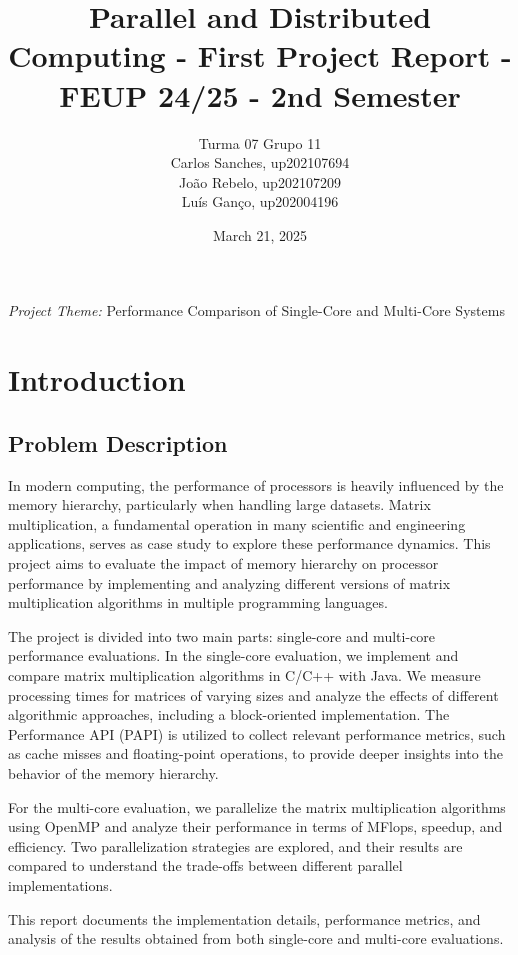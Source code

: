 \documentclass{article}
\title{Parallel and Distributed Computing - First Project Report - FEUP 24/25 - 2nd Semester}
\author{
Turma 07 Grupo 11 \\
Carlos Sanches, up202107694 \\
João Rebelo, up202107209 \\
Luís Ganço, up202004196
}
\date{March 21, 2025}
\begin{document}
\newpage 

\maketitle
\begin{center}
    \large \textit{Project Theme:} Performance Comparison of Single-Core and Multi-Core Systems
\end{center}
\newpage
\tableofcontents
\newpage %

\section{Introduction}

\subsection{Problem Description}
In modern computing, the performance of processors is heavily influenced by the memory hierarchy, particularly when handling large datasets. Matrix multiplication, a fundamental operation in many scientific and engineering applications, serves as case study to explore these performance dynamics. This project aims to evaluate the impact of memory hierarchy on processor performance by implementing and analyzing different versions of matrix multiplication algorithms in multiple programming languages.

The project is divided into two main parts: single-core and multi-core performance evaluations. In the single-core evaluation, we implement and compare matrix multiplication algorithms in C/C++ with Java. We measure processing times for matrices of varying sizes and analyze the effects of different algorithmic approaches, including a block-oriented implementation. The Performance API (PAPI) is utilized to collect relevant performance metrics, such as cache misses and floating-point operations, to provide deeper insights into the behavior of the memory hierarchy.

For the multi-core evaluation, we parallelize the matrix multiplication algorithms using OpenMP and analyze their performance in terms of MFlops, speedup, and efficiency. Two parallelization strategies are explored, and their results are compared to understand the trade-offs between different parallel implementations.

This report documents the implementation details, performance metrics, and analysis of the results obtained from both single-core and multi-core evaluations. 
\end{document}
